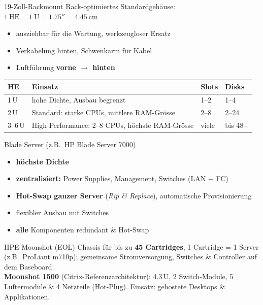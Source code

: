 \documentclass[a4paper, fontsize=7pt]{scrartcl}
\renewcommand*{\arraystretch}{1.5}  %
\begin{document}
\begin{mainbox}{19-Zoll-Rackmount}
Rack-optimiertes Standardgehäuse:
$\boxed{1\ \text{HE} = 1\ \text{U} = 1.75'' = 4.45\ \text{cm}}$
\begin{itemize}
    \item ausziehbar für die Wartung, werkzeugloser Ersatz
    \item Verkabelung hinten, Schwenkarm für Kabel
    \item Luftführung \textbf{vorne $\to$ hinten}
\end{itemize}
\renewcommand*{\arraystretch}{1.15}
\setlength{\tabcolsep}{3pt}
\begin{tabularx}{\linewidth}{@{}l|>{\raggedright\arraybackslash}X|l|l@{}}
\textbf{HE} & \textbf{Einsatz} & \textbf{Slots} & \textbf{Disks} \\
\hline
1\,U & hohe Dichte, Ausbau begrenzt & 1--2 & 1--4 \\
2\,U & Standard: starke CPUs, mittlere RAM-Grösse & 2--8 & 2--24 \\
3--6\,U & High Performance: 2--8 CPUs, höchste RAM-Grösse & viele & bis
  48+ \\
\end{tabularx}
\end{mainbox}

\begin{mainbox}{Blade Server (z.B.\ HP Blade Server 7000)}
\begin{itemize}
    \item \textbf{höchste Dichte}
    \item \textbf{zentralisiert:} Power Supplies, Management, Switches (LAN + FC)
    \item \textbf{Hot-Swap ganzer Server} (\emph{Rip \& Replace}), automatische
          Provisionierung
    \item flexibler Ausbau mit Switches
    \item \textbf{alle} Komponenten redundant \& Hot-Swap
\end{itemize}
\end{mainbox}

\begin{subbox}{HPE Moonshot (EOL)}
Chassis für bis zu \textbf{45 Cartridges}, 1 Cartridge = 1 Server (z.B.\ ProLiant
m710p); gemeinsame Stromversorgung, Switches \& Controller auf dem Baseboard.\\
\textbf{Moonshot 1500} (Citrix-Referenzarchitektur): 4.3\,U, 2 Switch-Module,
5 Lüftermodule \& 4 Netzteile (Hot-Plug). Einsatz: gehostete Desktops \&
Applikationen.
\end{subbox}
\end{document}
